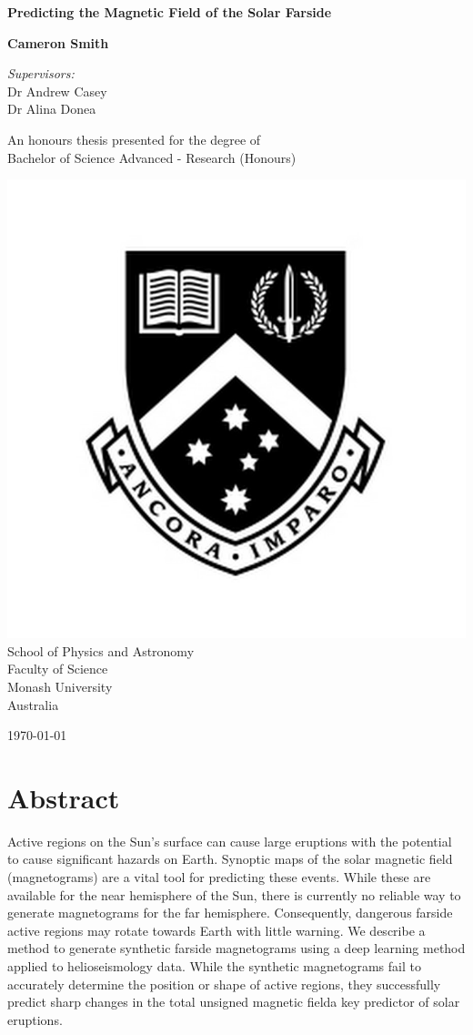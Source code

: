 \documentclass[11pt,a4paper,onecolumn]{report}
\begin{document}
\begin{titlepage}
  \begin{center}
    \vspace*{2cm}
    \Huge
    \textbf{Predicting the Magnetic Field of the Solar Farside}

    \vspace{2cm}
    \LARGE
    \textbf{Cameron Smith}

    \vspace{0.8cm}
    \Large \textit{Supervisors:}\\
    Dr Andrew Casey\\
    Dr Alina Donea

    \vfill
    \large
    An honours thesis presented for the degree of\\
    Bachelor of Science Advanced - Research (Honours)

    \vspace{0.3cm}
    \includegraphics[width=0.2\linewidth]{"Monash_Logo"}\\
    School of Physics and Astronomy\\
    Faculty of Science\\
    Monash University\\
    Australia

    \vspace{0.5cm}

    \today

  \end{center}
\end{titlepage}

\chapter*{Abstract}
Active regions on the Sun's surface can cause large eruptions with the
potential to cause significant hazards on Earth. Synoptic maps of the solar
magnetic field (magnetograms) are a vital tool for predicting these
events. While these are available for the near hemisphere of the Sun,
there is currently no reliable way to generate magnetograms for the far
hemisphere. Consequently, dangerous farside active regions may rotate towards
Earth with little warning. We describe a method to generate synthetic
farside magnetograms using a deep learning method applied to helioseismology
data. While the synthetic magnetograms fail to accurately determine the position
or shape of active regions, they successfully predict sharp changes in the total
unsigned magnetic field\textemdash a key predictor of solar eruptions.
\end{document}
